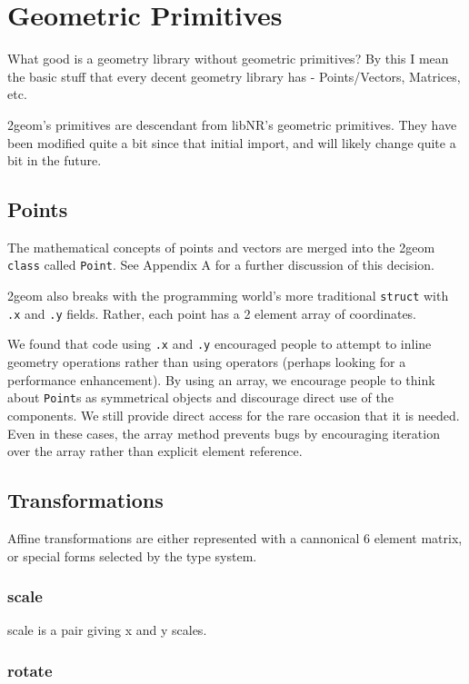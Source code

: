 \chapter{Geometric Primitives}

What good is a geometry library without geometric primitives?  By this
I mean the basic stuff that every decent geometry library has -
Points/Vectors, Matrices, etc.

2geom's primitives are descendant from libNR's geometric primitives.
They have been modified quite a bit since that initial import, and
will likely change quite a bit in the future.

\section{Points}

The mathematical concepts of points and vectors are merged into the
2geom \verb|class| called \verb|Point|.  See Appendix A for a further discussion of
this decision.

2geom also breaks with the programming world's more traditional
\verb|struct| with \verb|.x| and \verb|.y| fields.  Rather, each
point has a 2 element array of coordinates.

We found that code using \verb|.x| and \verb|.y| encouraged people
to attempt to inline geometry operations rather than using operators
(perhaps looking for a performance enhancement).  By using an array, we
encourage people to think about \verb|Point|s as symmetrical objects
and discourage direct use of the components.  We still provide direct
access for the rare occasion that it is needed.  Even in these cases,
the array method prevents bugs by encouraging iteration over the
array rather than explicit element reference.

\section{Transformations}

Affine transformations are either represented with a cannonical 6
element matrix, or special forms selected by the type system.

\subsection{scale}

scale is a pair giving x and y scales.

\subsection{rotate}

